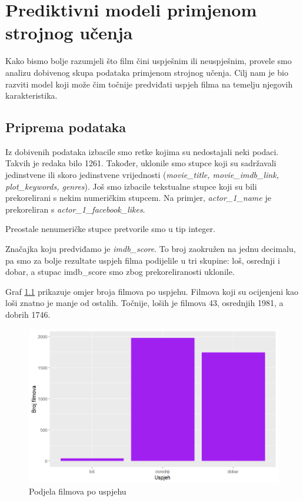 

\chapter{Prediktivni modeli primjenom \\ strojnog učenja}

Kako bismo bolje razumjeli što film čini uspješnim ili neuspješnim, provele smo analizu dobivenog skupa podataka primjenom strojnog učenja. Cilj nam je bio razviti model koji može čim točnije predviđati uspjeh filma na temelju njegovih karakteristika.
\\
\section{Priprema podataka}
Iz dobivenih podataka izbacile smo retke kojima su nedostajali neki podaci. Takvih je redaka bilo 1261. Također, uklonile smo stupce koji su sadržavali jedinstvene ili skoro jedinstvene vrijednosti (\textit{movie\_title, movie\_imdb\_link, plot\_keywords, genres}). Još smo izbacile tekstualne stupce koji su bili prekorelirani s nekim numeričkim stupcem. Na primjer, \textit{actor\_1\_name} je prekoreliran s \textit{actor\_1\_facebook\_likes}. 

 
Preostale nenumeričke stupce pretvorile smo u tip integer. 



Značajka koju predviđamo je \textit{imdb\_score}. To broj zaokružen na jednu decimalu, pa smo za bolje rezultate uspjeh filma podijelile u tri skupine: loš, osrednji i dobar, a stupac imdb\_score smo zbog prekoreliranosti uklonile. 



Graf \ref{fig:ml1} prikazuje omjer broja filmova po uspjehu. Filmova koji su ocijenjeni kao loši znatno je manje od ostalih. Točnije, loših je filmova 43, osrednjih 1981, a dobrih 1746.

\begin{figure}[H]
	\centering
	\includegraphics[width=15cm]{../figures/expl/001.png}
	\caption{Podjela filmova po uspjehu}
	\label{fig:ml1}
\end{figure}

